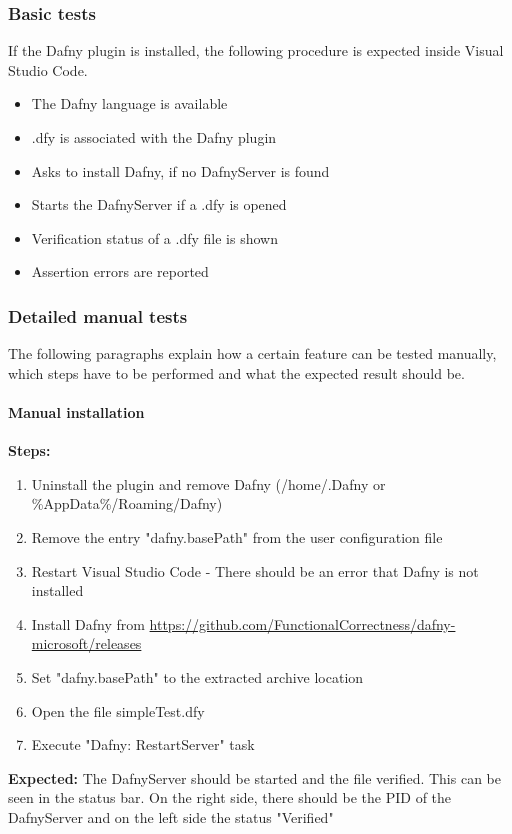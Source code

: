 \subsubsection{Basic tests}
If the Dafny plugin is installed, the following procedure is expected inside Visual Studio Code. 
\begin{itemize}
	\item The Dafny language is available
	\item .dfy is associated with the Dafny plugin
	\item Asks to install Dafny, if no DafnyServer is found 
	\item Starts the DafnyServer if a .dfy is opened
	\item Verification status of a .dfy file is shown
	\item Assertion errors are reported
\end{itemize}

\subsubsection{Detailed manual tests}
The following paragraphs explain how a certain feature can be tested manually, which steps have to be performed and what the expected result should be.

\paragraph{Manual installation}
\textbf{\newline Steps:}
\begin{enumerate}
	\item Uninstall the plugin and remove Dafny (/home/.Dafny or \%AppData\%/Roaming/Dafny)
	\item Remove the entry "dafny.basePath" from the user configuration file 
	\item Restart Visual Studio Code - There should be an error that Dafny is not installed
	\item Install Dafny from \href{https://github.com/FunctionalCorrectness/dafny-microsoft/releases}{https://github.com/FunctionalCorrectness/dafny-microsoft/releases}
	\item Set "dafny.basePath" to the extracted archive location
	\item Open the file simpleTest.dfy
	\item Execute "Dafny: RestartServer" task
\end{enumerate}
\textbf{\newline Expected:}
The DafnyServer should be started and the file verified. This can be seen in the status bar. On the right side, there should be the PID of the DafnyServer and on the left side the status "Verified"

